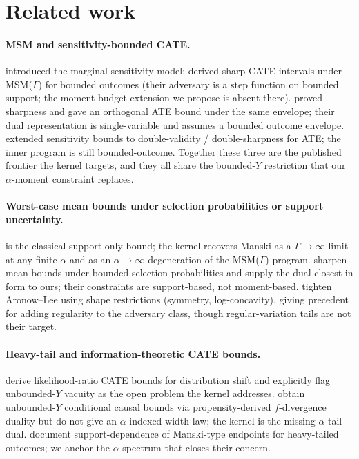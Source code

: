 \documentclass[11pt]{article}
\theoremstyle{definition}
\theoremstyle{plain}
\theoremstyle{remark}
\begin{document}
\section{Related work}

\paragraph{MSM and sensitivity-bounded CATE.}
\cite{Tan2006MSM} introduced the marginal sensitivity model; \cite{KallusMaoZhou2019CATEIntervals} derived sharp CATE intervals under MSM($\Gamma$) for bounded outcomes (their adversary is a step function on bounded support; the moment-budget extension we propose is absent there). \cite{YadlowskyNamkoongBasuDuchiTian2022Bounds} proved sharpness and gave an orthogonal ATE bound under the same envelope; their dual representation is single-variable and assumes a bounded outcome envelope. \cite{DornGuoKallus2025DVDS} extended sensitivity bounds to double-validity / double-sharpness for ATE; the inner program is still bounded-outcome. Together these three are the published frontier the kernel targets, and they all share the bounded-$Y$ restriction that our $\alpha$-moment constraint replaces.

\paragraph{Worst-case mean bounds under selection probabilities or support uncertainty.}
\cite{Manski1990AERBounds} is the classical support-only bound; the kernel recovers Manski as a $\Gamma\to\infty$ limit at any finite $\alpha$ and as an $\alpha\to\infty$ degeneration of the MSM($\Gamma$) program. \cite{AronowLee2013BoundedSelection} sharpen mean bounds under bounded selection probabilities and supply the dual closest in form to ours; their constraints are support-based, not moment-based. \cite{MiratrixWagerZubizarreta2018ShapeConstrained} tighten Aronow--Lee using shape restrictions (symmetry, log-concavity), giving precedent for adding regularity to the adversary class, though regular-variation tails are not their target.

\paragraph{Heavy-tail and information-theoretic CATE bounds.}
\cite{AsiaeePalBeckHuling2026SharpGeneralization} derive likelihood-ratio CATE bounds for distribution shift and explicitly flag unbounded-$Y$ vacuity as the open problem the kernel addresses. \cite{JungKang2026ITBounds} obtain unbounded-$Y$ conditional causal bounds via propensity-derived $f$-divergence duality but do not give an $\alpha$-indexed width law; the kernel is the missing $\alpha$-tail dual. \cite{LordanSalehzadehNobari2026TailUncertainty} document support-dependence of Manski-type endpoints for heavy-tailed outcomes; we anchor the $\alpha$-spectrum that closes their concern.
\end{document}
